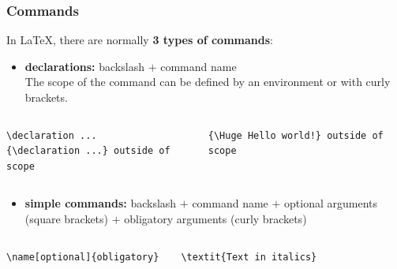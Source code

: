 \begin{frame}[fragile]
\frametitle{Commands}

In \LaTeX , there are normally \textbf{3 types of commands}:

\begin{itemize}
	\item \textbf{declarations:} backslash $+$ command name\\
	The scope of the command can be defined by an environment or with curly brackets. 
\end{itemize}

\vspace{-.5cm}

\begin{columns}
	
\begin{lstlisting}
\declaration ... 
{\declaration ...} outside of scope

\end{lstlisting}
	
	
\begin{lstlisting}
{\Huge Hello world!} outside of scope
\end{lstlisting}
	
\end{columns}

\pause

\begin{itemize}
	\item \textbf{simple commands:} backslash $+$ command name $+$ optional arguments (square brackets) $+$ obligatory arguments (curly brackets)
\end{itemize}

\vspace{-.5cm}

\begin{columns}
	
\begin{lstlisting}
\name[optional]{obligatory} 
\end{lstlisting}

	
\begin{lstlisting}
\textit{Text in italics} 
\end{lstlisting}
	
\end{columns}


\end{frame}
